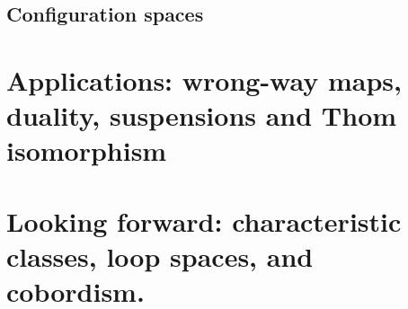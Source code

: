 \documentclass{amsart}          %
\begin{document}
\subsection{Configuration spaces}

\section{Applications: wrong-way maps, duality, suspensions and Thom isomorphism}

\section{Looking forward: characteristic classes, loop spaces, and cobordism.}

\nocite{*}


\printindex
\end{document}
